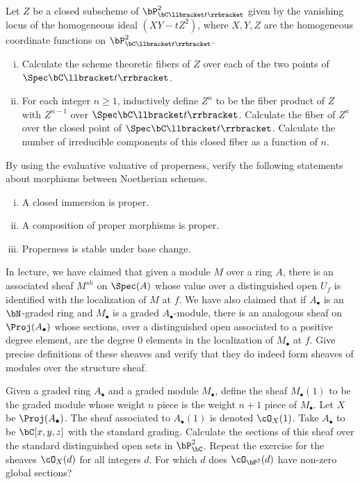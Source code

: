 \begin{homework}[e]
	\prob Let $Z$ be a closed subscheme of $\bP^2_{\bC\llbracket t\rrbracket}$ given by the vanishing locus of the homogeneous ideal $(XY - tZ^2)$, where $X, Y, Z$ are the homogeneous coordinate functions on $\bP^2_{\bC\llbracket t \rrbracket}$.
	\begin{enumerate}[(i)]
		\item Calculate the scheme theoretic fibers of $Z$ over each of the two points of $\Spec \bC\llbracket t\rrbracket$.

		\item For each integer $n \geq 1$, inductively define $Z^n$ to be the fiber product of $Z$ with $Z^{n-1}$ over $\Spec \bC\llbracket t \rrbracket$. Calculate the fiber of $Z^n$ over the closed point of $\Spec \bC\llbracket t\rrbracket$. Calculate the number of irreducible components of this closed fiber as a function of $n$. 
	\end{enumerate}

	\prob By using the evaluative valuative of properness, verify the following statements about morphisms between Noetherian schemes.
	\begin{enumerate}[(i)]
		\item A closed immersion is proper.
		\item A composition of proper morphisms is proper. 
		\item Properness is stable under base change.
	\end{enumerate}

	\prob In lecture, we have claimed that given a module $M$ over a ring $A$, there is an associated sheaf $M^{sh}$ on $\Spec (A)$ whose value over a distinguished open $U_f$ is identified with the localization of $M$ at $f$. We have also claimed that if $A_\bullet$ is an $\bN$-graded ring and $M_\bullet$ is a graded $A_\bullet$-module, there is an analogous sheaf on $\Proj(A_\bullet)$ whose sections, over a distinguished open associated to a positive degree element, are the degree 0 elements in the localization of $M_\bullet$ at $f$. Give precise definitions of these sheaves and verify that they do indeed form sheaves of modules over the structure sheaf.

	\medskip

	\noindent Given a graded ring $A_\bullet$ and a graded module $M_\bullet$, define the sheaf $M_\bullet(1)$ to be the graded module whose weight $n$ piece is the weight $n+1$ piece of $M_\bullet$. Let $X$ be $\Proj(A_\bullet)$. The sheaf associated to $A_\bullet(1)$ is denoted $\cO_X(1)$. Take $A_\bullet$ to be $\bC[x,y,z]$ with the standard grading. Calculate the sections of this sheaf over the standard distinguished open sets in $\bP^2_{\bC}$. Repeat the exercise for the sheaves $\cO_X(d)$ for all integers $d$. For which $d$ does $\cO_{\bP^2}(d)$ have non-zero global sections?


\end{homework}

